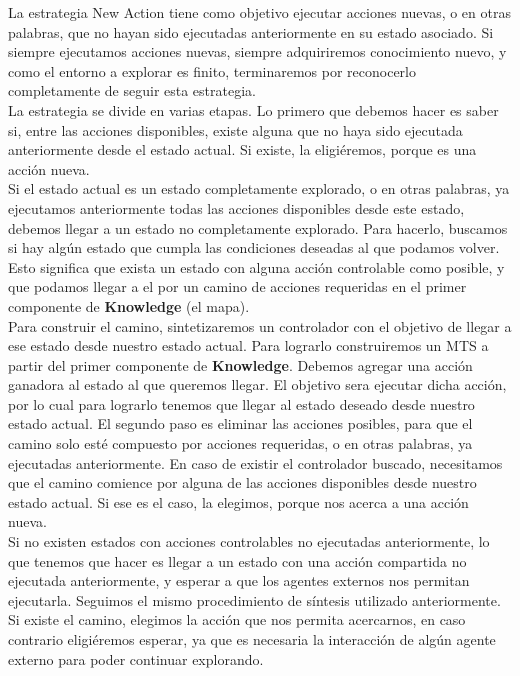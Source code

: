 \vspace{\baselineskip}
La estrategia New Action tiene como objetivo ejecutar acciones nuevas, o en otras palabras, que no hayan sido ejecutadas anteriormente en su estado asociado.
Si siempre ejecutamos acciones nuevas, siempre adquiriremos conocimiento nuevo, y como el entorno a explorar es finito, terminaremos por reconocerlo completamente
de seguir esta estrategia.\\
La estrategia se divide en varias etapas. Lo primero que debemos hacer es saber si, entre las acciones disponibles, existe alguna que no haya sido ejecutada
anteriormente desde el estado actual. Si existe, la eligiéremos, porque es una acción nueva.\\
Si el estado actual es un estado completamente explorado, o en otras palabras, ya ejecutamos anteriormente todas las acciones disponibles desde este estado, debemos
llegar a un estado no completamente explorado. Para hacerlo, buscamos si hay algún estado que cumpla las condiciones deseadas al que podamos volver. Esto
significa que exista un estado con alguna acción controlable como posible, y que podamos llegar a el por un camino de acciones requeridas en el primer componente
de \textbf{Knowledge} (el mapa).\\
Para construir el camino, sintetizaremos un controlador con el objetivo de llegar a ese estado desde nuestro estado actual. Para lograrlo construiremos un MTS
a partir del primer componente de \textbf{Knowledge}. Debemos agregar una acción ganadora al estado al que queremos llegar. El objetivo sera ejecutar dicha acción,
por lo cual para lograrlo tenemos que llegar al estado deseado desde nuestro estado actual. El segundo paso es eliminar las acciones posibles, para que el camino
solo esté compuesto por acciones requeridas, o en otras palabras, ya ejecutadas anteriormente. En caso de existir el controlador buscado, necesitamos que el camino
comience por alguna de las acciones disponibles desde nuestro estado actual. Si ese es el caso, la elegimos, porque nos acerca a una acción nueva.\\
Si no existen estados con acciones controlables no ejecutadas anteriormente, lo que tenemos que hacer es llegar a un estado con una acción compartida no ejecutada
anteriormente, y esperar a que los agentes externos nos permitan ejecutarla. Seguimos el mismo procedimiento de síntesis utilizado anteriormente. Si existe el camino,
elegimos la acción que nos permita acercarnos, en caso contrario eligiéremos esperar, ya que es necesaria la interacción de algún agente externo para poder continuar
explorando.

